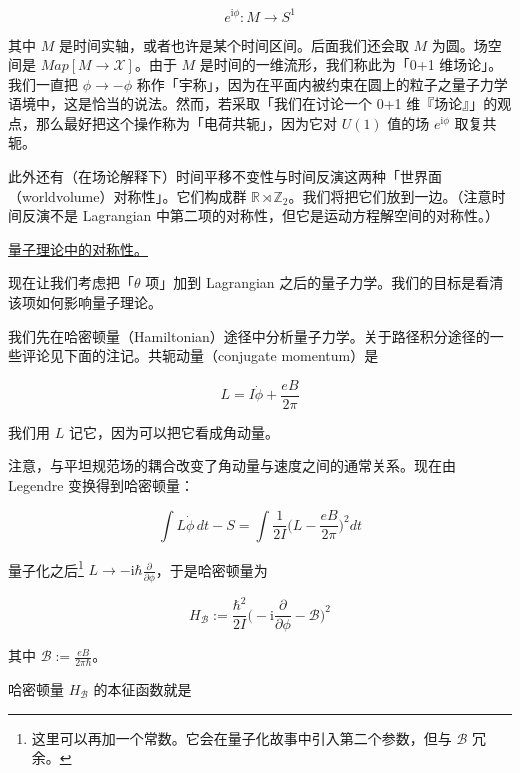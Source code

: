 \begin{equation}
  e^{\mathrm{i}\phi}:M\to S^{1}
  \tag{2.7}
  \label{eq:2.7}
\end{equation}

其中 $M$ 是时间实轴，或者也许是某个时间区间。后面我们还会取 $M$ 为圆。场空间是 $Map[M\to\mathcal{X}]$。由于 $M$ 是时间的一维流形，我们称此为「0+1 维场论」。我们一直把 $\phi\to-\phi$ 称作「宇称」，因为在平面内被约束在圆上的粒子之量子力学语境中，这是恰当的说法。然而，若采取「我们在讨论一个 0+1 维『场论』」的观点，那么最好把这个操作称为「电荷共轭」，因为它对 $U(1)$ 值的场 $e^{\mathrm{i}\phi}$ 取复共轭。

此外还有（在场论解释下）时间平移不变性与时间反演这两种「世界面（worldvolume）对称性」。它们构成群 $\mathbb{R}\rtimes\mathbb{Z}_2$。我们将把它们放到一边。（注意时间反演不是 Lagrangian 中第二项的对称性，但它是运动方程解空间的对称性。）

\underline{量子理论中的对称性。}

现在让我们考虑把「$\theta$ 项」加到 Lagrangian 之后的量子力学。我们的目标是看清该项如何影响量子理论。

我们先在哈密顿量（Hamiltonian）途径中分析量子力学。关于路径积分途径的一些评论见下面的注记。共轭动量（conjugate momentum）是

\begin{equation}
  L=I\dot\phi+\frac{eB}{2\pi}
  \tag{2.8}
  \label{eq:2.8}
\end{equation}

我们用 $L$ 记它，因为可以把它看成角动量。

注意，与平坦规范场的耦合改变了角动量与速度之间的通常关系。现在由 Legendre 变换得到哈密顿量：

\begin{equation}
  \int L\dot\phi\,dt-S=\int\frac{1}{2I}\Big(L-\frac{eB}{2\pi}\Big)^{2}dt
  \tag{2.9}
  \label{eq:2.9}
\end{equation}

量子化之后\footnote{这里可以再加一个常数。它会在量子化故事中引入第二个参数，但与 $\mathcal{B}$ 冗余。} $L\to-\mathrm{i}\hbar\frac{\partial}{\partial\phi}$，于是哈密顿量为

\begin{equation}
  H_{\mathcal{B}}:=\frac{\hbar^{2}}{2I}\Big(-\mathrm{i}\frac{\partial}{\partial\phi}-\mathcal{B}\Big)^{2}
  \tag{2.10}
  \label{eq:2.10}
\end{equation}

其中 $\mathcal{B}:=\frac{eB}{2\pi\hbar}$。

哈密顿量 $H_{\mathcal{B}}$ 的本征函数就是

